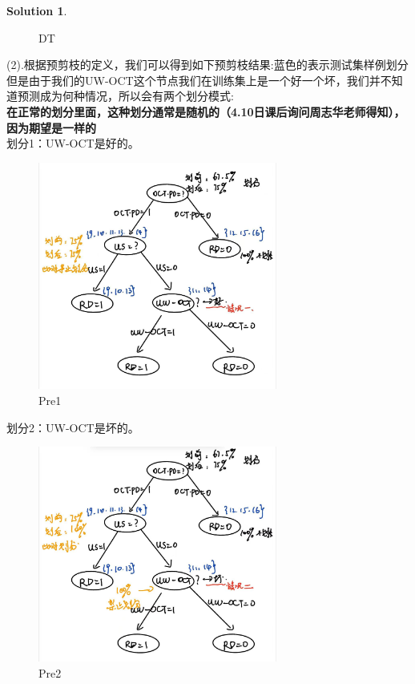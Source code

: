 \documentclass[a4paper]{article}
\numberwithin{equation}{section}
\theoremstyle{definition}
\newtheorem*{solution}{Solution}
\begin{document}
\begin{solution}
\begin{figure}[H]
		\caption{DT}
		\label{fig:roc0}
	\end{figure}
    (2).根据预剪枝的定义，我们可以得到如下预剪枝结果:蓝色的表示测试集样例划分\\
    但是由于我们的UW-OCT这个节点我们在训练集上是一个好一个坏，我们并不知道预测成为何种情况，所以会有两个划分模式:\\
    \textbf{在正常的划分里面，这种划分通常是随机的（4.10日课后询问周志华老师得知），因为期望是一样的}\\
    划分1：UW-OCT是好的。\\
    \begin{figure}[H]
		\centering
		\includegraphics[width=0.7\textwidth]{Pre1.png}
		\caption{Pre1}
		\label{fig:roc1}
	\end{figure}
    划分2：UW-OCT是坏的。\\
    \begin{figure}[H]
		\centering
		\includegraphics[width=0.7\textwidth]{Pre2.png}
		\caption{Pre2}
		\label{fig:roc2}
	\end{figure}
\end{solution}
\end{document}
